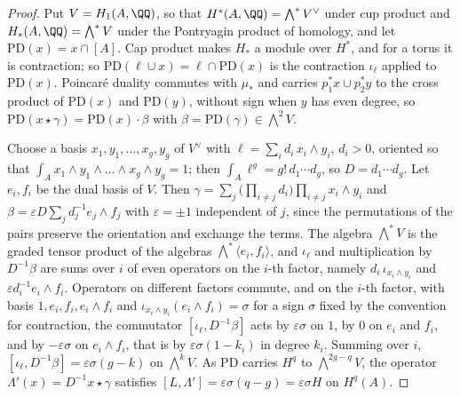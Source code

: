 \begin{proof}
Put $V=H_{1}(A,\QQ)$, so that $H^{*}(A,\QQ)=\bigwedge^{*}V^{\vee}$ under cup
product and $H_{*}(A,\QQ)=\bigwedge^{*}V$ under the Pontryagin product of
homology, and let $\mathrm{PD}(x)=x\cap[A]$. Cap product makes
$H_{*}$ a module over $H^{*}$, and for a torus it is contraction; so
$\mathrm{PD}(\ell\cup x)=\ell\cap\mathrm{PD}(x)$ is the contraction
$\iota_{\ell}$ applied to $\mathrm{PD}(x)$. Poincar\'e duality commutes
with $\mu_{*}$ and carries $p_{1}^{*}x\cup p_{2}^{*}y$ to the cross product
of $\mathrm{PD}(x)$ and $\mathrm{PD}(y)$, without sign when $y$ has even
degree, so $\mathrm{PD}(x\star\gamma)=\mathrm{PD}(x)\cdot\beta$ with
$\beta=\mathrm{PD}(\gamma)\in\bigwedge^{2}V$.

Choose a basis $x_{1},y_{1},\dots,x_{g},y_{g}$ of $V^{\vee}$ with
$\ell=\sum_{i}d_{i}\,x_{i}\wedge y_{i}$, $d_{i}>0$, oriented so that
$\int_{A}x_{1}\wedge y_{1}\wedge\dots\wedge x_{g}\wedge y_{g}=1$; then
$\int_{A}\ell^{g}=g!\,d_{1}\cdots d_{g}$, so $D=d_{1}\cdots d_{g}$. Let
$e_{i},f_{i}$ be the dual basis of $V$. Then
$\gamma=\sum_{j}\bigl(\prod_{i\ne j}d_{i}\bigr)\prod_{i\ne j}x_{i}\wedge y_{i}$
and $\beta=\varepsilon D\sum_{j}d_{j}^{-1}e_{j}\wedge f_{j}$ with
$\varepsilon=\pm1$ independent of $j$, since the permutations of the pairs
preserve the orientation and exchange the terms. The algebra $\bigwedge^{*}V$
is the graded tensor product of the algebras
$\bigwedge^{*}\langle e_{i},f_{i}\rangle$, and $\iota_{\ell}$ and
multiplication by $D^{-1}\beta$ are sums over $i$ of even operators on the
$i$-th factor, namely $d_{i}\,\iota_{x_{i}\wedge y_{i}}$ and
$\varepsilon d_{i}^{-1}e_{i}\wedge f_{i}$. Operators on different factors
commute, and on the $i$-th factor, with basis $1,e_{i},f_{i},e_{i}\wedge
f_{i}$ and $\iota_{x_{i}\wedge y_{i}}(e_{i}\wedge f_{i})=\sigma$ for a sign
$\sigma$ fixed by the convention for contraction, the commutator
$[\iota_{\ell},D^{-1}\beta]$ acts by $\varepsilon\sigma$ on $1$, by $0$ on
$e_{i}$ and $f_{i}$, and by $-\varepsilon\sigma$ on $e_{i}\wedge f_{i}$, that
is by $\varepsilon\sigma(1-k_{i})$ in degree $k_{i}$. Summing over $i$,
$[\iota_{\ell},D^{-1}\beta]=\varepsilon\sigma(g-k)$ on $\bigwedge^{k}V$. As
$\mathrm{PD}$ carries $H^{q}$ to $\bigwedge^{2g-q}V$, the operator
$\Lambda'(x)=D^{-1}x\star\gamma$ satisfies
$[L,\Lambda']=\varepsilon\sigma(q-g)=\varepsilon\sigma H$ on $H^{q}(A)$.


\end{proof}

